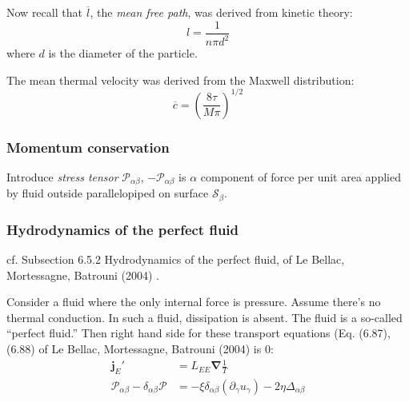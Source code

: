 Now recall that $\overline{l}$, the \emph{mean free path}, was derived from kinetic theory:
\[
l = \frac{1}{n\pi d^2}
\]
where $d$ is the diameter of the particle.  

The mean thermal velocity was derived from the Maxwell distribution:
\[
\overline{c} = \left( \frac{ 8 \tau }{M \pi} \right)^{1/2}
\]








\subsubsection{Momentum conservation}

Introduce \emph{stress tensor} $\mathcal{P}_{\alpha \beta}$, $-\mathcal{P}_{\alpha \beta}$ is $\alpha$ component of force per unit area applied by fluid outside parallelopiped on surface $\mathcal{S}_{\beta}$.  









\subsubsection{Hydrodynamics of the perfect fluid}

cf. Subsection 6.5.2 Hydrodynamics of the perfect fluid, of Le Bellac, Mortessagne, Batrouni (2004) \cite{MLeBellacFMortessagneGBatrouni2004}.  

Consider a fluid where the only internal force is pressure.  Assume there's no thermal conduction.  In such a fluid, dissipation is absent.  The fluid is a so-called ``perfect fluid.''  Then right hand side for these transport equations (Eq. (6.87), (6.88) of Le Bellac, Mortessagne, Batrouni (2004) \cite{MLeBellacFMortessagneGBatrouni2004} is $0$:
\[
\begin{aligned}
  \mathbf{j}_E' & = L_{EE} \mathbf{\nabla} \frac{1}{T} \\  
\mathcal{P}_{\alpha \beta} - \delta_{\alpha \beta} \mathcal{P}  & = -\xi \delta_{\alpha \beta} (\partial_{\gamma} u_{\gamma} ) - 2 \eta \Delta_{\alpha \beta}
\end{aligned}
\]


